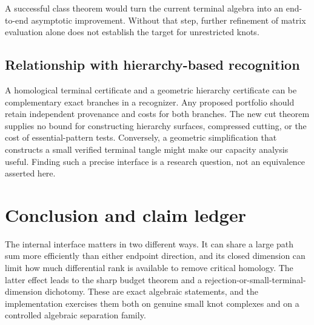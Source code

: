 \documentclass[11pt,letterpaper]{article}
\theoremstyle{definition}\newtheorem{definition}[theorem]{Definition}
\theoremstyle{remark}\newtheorem{remark}[theorem]{Remark}
\begin{document}
A successful class theorem would turn the current terminal algebra into an
end-to-end asymptotic improvement. Without that step, further refinement of
matrix evaluation alone does not establish the target for unrestricted knots.

\subsection{Relationship with hierarchy-based recognition}
A homological terminal certificate and a geometric hierarchy certificate can
be complementary exact branches in a recognizer. Any proposed portfolio
should retain independent provenance and costs for both branches. The new
cut theorem supplies no bound for constructing hierarchy surfaces, compressed
cutting, or the cost of essential-pattern tests. Conversely, a geometric
simplification that constructs a small verified terminal tangle might make
our capacity analysis useful. Finding such a precise interface is a research
question, not an equivalence asserted here.

\section{Conclusion and claim ledger}
The internal interface matters in two different ways. It can share a large
path sum more efficiently than either endpoint direction, and its closed
dimension can limit how much differential rank is available to remove
critical homology. The latter effect leads to the sharp budget theorem and
a rejection-or-small-terminal-dimension dichotomy. These are exact algebraic
statements, and the implementation exercises them both on genuine small
knot complexes and on a controlled algebraic separation family.
\end{document}
